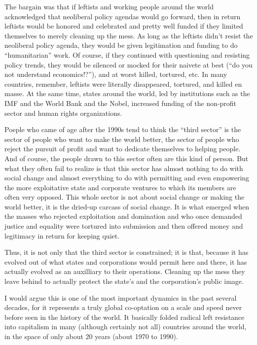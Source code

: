 \documentclass[12pt,book]{article}
\begin{document}
The bargain was that if leftists and working people around the world
acknowledged that neoliberal policy agendas would go forward, then in
return leftists would be honored and celebrated and pretty well funded
if they limited themselves to merely cleaning up the mess. As long as
the leftists didn't resist the neoliberal policy agenda, they would be
given legitimation and funding to do ``humanitarian'' work. Of course,
if they continued with questioning and resisting policy trends, they
would be silenced or mocked for their naivete at best (``do you not
understand economics!?''), and at worst killed, tortured, etc. In many
countries, remember, leftists were literally disappeared, tortured, and
killed en masse. At the same time, states around the world, led by
institutions such as the IMF and the World Bank and the Nobel, increased
funding of the non-profit sector and human rights organizations.

Poeple who came of age after the 1990s tend to think the ``third
sector'' is the sector of people who want to make the world better, the
sector of people who reject the pursuit of profit and want to dedicate
themselves to helping people. And of course, the people drawn to this
sector often are this kind of person. But what they often fail to
realize is that this sector has almost nothing to do with social change
and almost everything to do with permitting and even empowering the more
exploitative state and corporate ventures to which its members are often
very opposed. This whole sector is not about social change or making the
world better, it is the dried-up carcass of social change. It is what
emerged when the masses who rejected exploitation and domination and who
once demanded justice and equality were tortured into submission and
then offered money and legitimacy in return for keeping quiet.

Thus, it is not only that the third sector is constrained; it is that,
because it has evolved out of what states and corporations would permit
here and there, it has actually evolved as an auxilliary to their
operations. Cleaning up the mess they leave behind to actually protect
the state's and the corporation's public image.

I would argue this is one of the most important dynamics in the past
several decades, for it represents a truly global co-optation on a scale
and speed never before seen in the history of the world. It basically
folded radical left resistance into capitalism in many (although
certainly not all) countries around the world, in the space of only
about 20 years (about 1970 to 1990).
\end{document}
